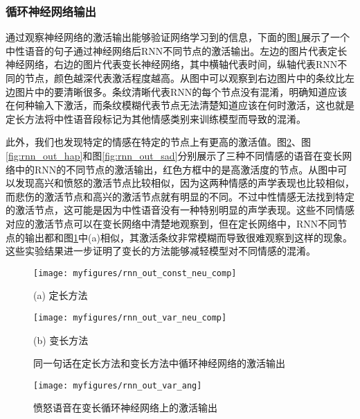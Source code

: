 \subsubsection{循环神经网络输出}
\label{sec:var_len_experiement_rnn}

通过观察神经网络的激活输出能够验证网络学习到的信息，下面的图\ref{fig:rnn_out_comp}展示了一个中性语音的句子通过神经网络后RNN不同节点的激活输出。左边的图片代表定长神经网络，右边的图片代表变长神经网络，其中横轴代表时间，纵轴代表RNN不同的节点，颜色越深代表激活程度越高。从图中可以观察到右边图片中的条纹比左边图片中的要清晰很多。条纹清晰代表RNN的每个节点没有混淆，明确知道应该在何种输入下激活，而条纹模糊代表节点无法清楚知道应该在何时激活，这也就是定长方法将中性语音段标记为其他情感类别来训练模型而导致的混淆。

此外，我们也发现特定的情感在特定的节点上有更高的激活值。图\ref{fig:rnn_out_ang}、图\ref{fig:rnn_out_hap}和图\ref{fig:rnn_out_sad}分别展示了三种不同情感的语音在变长网络中的RNN的不同节点的激活输出，红色方框中的是高激活度的节点。从图中可以发现高兴和愤怒的激活节点比较相似，因为这两种情感的声学表现也比较相似，而悲伤的激活节点和高兴的激活节点就有明显的不同。不过中性情感无法找到特定的激活节点，这可能是因为中性语音没有一种特别明显的声学表现。这些不同情感对应的激活节点可以在变长网络中清楚地观察到，但在定长网络中，RNN不同节点的输出都和图\ref{fig:rnn_out_comp}中(a)相似，其激活条纹非常模糊而导致很难观察到这样的现象。这些实验结果进一步证明了变长的方法能够减轻模型对不同情感的混淆。

\begin{figure}[htb]
\begin{minipage}{0.48\textwidth}
    \centering
    \texttt{[image: myfigures/rnn\_out\_const\_neu\_comp]}
    \centerline{(a) 定长方法}\medskip
\end{minipage}\hfill
\begin{minipage}{0.48\textwidth}
    \centering
    \texttt{[image: myfigures/rnn\_out\_var\_neu\_comp]}
    \centerline{(b) 变长方法}\medskip
\end{minipage}
\caption{同一句话在定长方法和变长方法中循环神经网络的激活输出}
\label{fig:rnn_out_comp}
\end{figure}

\begin{figure}[htb] %
    \centering
    \texttt{[image: myfigures/rnn\_out\_var\_ang]}
    \caption{愤怒语音在变长循环神经网络上的激活输出}
    \label{fig:rnn_out_ang}
\end{figure}

